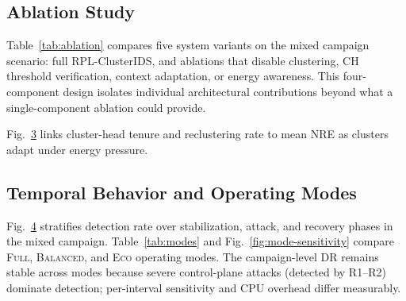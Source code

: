 \begin{figure}[!t]
  \centering
  \resizebox{\linewidth}{!}{}
  \caption{\CaptionFigSeven{} \CaptionFigStatusNote}
  \label{fig:energy-overhead}
\end{figure}

\begin{figure}[!t]
  \centering
  \resizebox{\linewidth}{!}{}
  \caption{\CaptionFigEight{} \CaptionFigStatusNote}
  \label{fig:alert-overhead}
\end{figure}

\subsection{Ablation Study}
Table~\ref{tab:ablation} compares five system variants on the mixed campaign scenario: full RPL-ClusterIDS, and ablations that disable clustering, CH threshold verification, context adaptation, or energy awareness.
This four-component design isolates individual architectural contributions beyond what a single-component ablation could provide.



Fig.~\ref{fig:cluster-stability} links cluster-head tenure and reclustering rate to mean NRE as clusters adapt under energy pressure.

\begin{figure}[!t]
  \centering
  \resizebox{\linewidth}{!}{}
  \caption{\CaptionFigNine{} \CaptionFigStatusNote}
  \label{fig:cluster-stability}
\end{figure}

\subsection{Temporal Behavior and Operating Modes}
Fig.~\ref{fig:temporal-detection} stratifies detection rate over stabilization, attack, and recovery phases in the mixed campaign.
Table~\ref{tab:modes} and Fig.~\ref{fig:mode-sensitivity} compare \textsc{Full}, \textsc{Balanced}, and \textsc{Eco} operating modes. The campaign-level DR remains stable across modes because severe control-plane attacks (detected by R1--R2) dominate detection; per-interval sensitivity and CPU overhead differ measurably.



\begin{figure}[!t]
  \centering
  \resizebox{\linewidth}{!}{}
  \caption{\CaptionFigTen{} \CaptionFigStatusNote}
  \label{fig:temporal-detection}
\end{figure}

